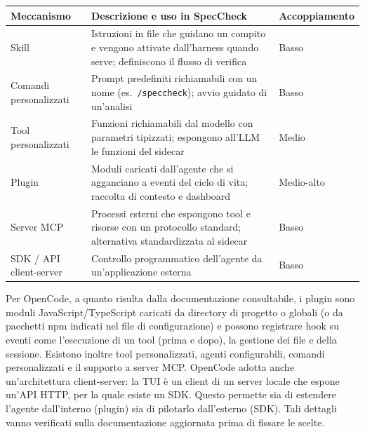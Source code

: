 \documentclass[a4paper, 11pt]{article}
\begin{document}
\vspace{0.3cm}
\noindent
\begin{tabularx}{\textwidth}{|l|X|l|}
    \hline
    \textbf{Meccanismo} & \textbf{Descrizione e uso in SpecCheck} & \textbf{Accoppiamento} \\ \hline
    Skill & Istruzioni in file che guidano un compito e vengono attivate dall'harness quando serve; definiscono il flusso di verifica & Basso \\ \hline
    Comandi personalizzati & Prompt predefiniti richiamabili con un nome (es.\ \texttt{/speccheck}); avvio guidato di un'analisi & Basso \\ \hline
    Tool personalizzati & Funzioni richiamabili dal modello con parametri tipizzati; espongono all'LLM le funzioni del sidecar & Medio \\ \hline
    Plugin & Moduli caricati dall'agente che si agganciano a eventi del ciclo di vita; raccolta di contesto e dashboard & Medio-alto \\ \hline
    Server MCP & Processi esterni che espongono tool e risorse con un protocollo standard; alternativa standardizzata al sidecar & Basso \\ \hline
    SDK / API client-server & Controllo programmatico dell'agente da un'applicazione esterna & Basso \\ \hline
\end{tabularx}
\vspace{0.3cm}

Per OpenCode, a quanto risulta dalla documentazione consultabile, i plugin sono moduli JavaScript/TypeScript caricati da directory di progetto o globali (o da pacchetti npm indicati nel file di configurazione) e possono registrare hook su eventi come l'esecuzione di un tool (prima e dopo), la gestione dei file e della sessione. Esistono inoltre tool personalizzati, agenti configurabili, comandi personalizzati e il supporto a server MCP. OpenCode adotta anche un'architettura client-server: la TUI è un client di un server locale che espone un'API HTTP, per la quale esiste un SDK. Questo permette sia di estendere l'agente dall'interno (plugin) sia di pilotarlo dall'esterno (SDK). Tali dettagli vanno verificati sulla documentazione aggiornata prima di fissare le scelte.
\end{document}
